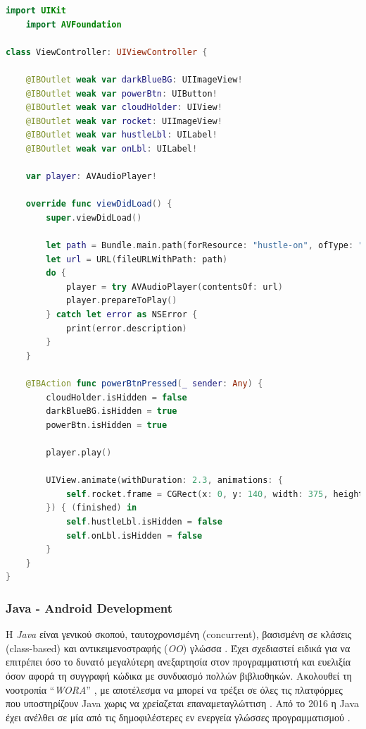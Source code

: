 \begin{lstlisting}[language=Swift, caption=\selectlanguage{greek}Παράδειγμα κώδικα σε \selectlanguage{english}Swift]
    import UIKit
    import AVFoundation
    
class ViewController: UIViewController {
    
    @IBOutlet weak var darkBlueBG: UIImageView!
    @IBOutlet weak var powerBtn: UIButton!
    @IBOutlet weak var cloudHolder: UIView!
    @IBOutlet weak var rocket: UIImageView!
    @IBOutlet weak var hustleLbl: UILabel!
    @IBOutlet weak var onLbl: UILabel!
    
    var player: AVAudioPlayer!
    
    override func viewDidLoad() {
        super.viewDidLoad()
        
        let path = Bundle.main.path(forResource: "hustle-on", ofType: "wav")!
        let url = URL(fileURLWithPath: path)
        do {
            player = try AVAudioPlayer(contentsOf: url)
            player.prepareToPlay()
        } catch let error as NSError {
            print(error.description)
        }
    }
    
    @IBAction func powerBtnPressed(_ sender: Any) {
        cloudHolder.isHidden = false
        darkBlueBG.isHidden = true
        powerBtn.isHidden = true
        
        player.play()
        
        UIView.animate(withDuration: 2.3, animations: {
            self.rocket.frame = CGRect(x: 0, y: 140, width: 375, height: 402)
        }) { (finished) in
            self.hustleLbl.isHidden = false
            self.onLbl.isHidden = false
        }
    }
}

\end{lstlisting}


\subsubsection{Java - Android Development}
Η \textit{Java} είναι γενικού σκοπού, ταυτοχρονισμένη (concurrent), βασισμένη σε κλάσεις (class-based) και αντικειμενοστραφής (\textit{OO}) γλώσσα \cite{[JAVA1]}. Έχει σχεδιαστεί ειδικά για να επιτρέπει όσο το δυνατό μεγαλύτερη ανεξαρτησία στον προγραμματιστή και ευελιξία όσον αφορά τη συγγραφή κώδικα με συνδυασμό πολλών βιβλιοθηκών. Ακολουθεί τη νοοτροπία ``\textit{WORA}'' \cite{[JAVA2]}, με αποτέλεσμα να μπορεί να τρέξει σε όλες τις πλατφόρμες που υποστηρίζουν Java χωρις να χρείαζεται επαναμεταγλώττιση \cite{[JAVA3]}. Από το 2016 η Java έχει ανέλθει σε μία από τις δημοφιλέστερες εν ενεργεία γλώσσες προγραμματισμού \cite{[JAVA4], [JAVA5], [JAVA6]}.

